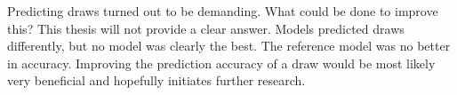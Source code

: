 Predicting draws turned out to be demanding. What could be done to improve this? This thesis will not provide a clear answer. Models predicted draws differently, but no model was clearly the best. The reference model was no better in accuracy. Improving the prediction accuracy of a draw would be most likely very beneficial and hopefully initiates further research.
